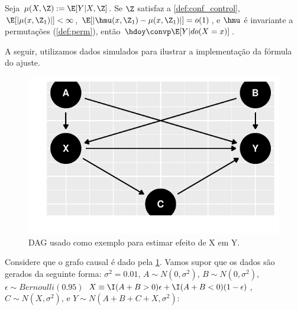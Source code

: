 \begin{theorem}
 \label{thm:conv_ajuste}
 Seja $\mu(X,\Z) := \E[Y|X,\Z]$.
 Se $\Z$ satisfaz a \cref{def:conf_control},
 $\E[|\mu(x,\Z_1)|] < \infty$,
 $\E[|\hmu(x,\Z_1)-\mu(x,\Z_1)|] = o(1)$, 
 e $\hmu$ é invariante a permutações (\cref{def:perm}), então
 $\hdoy \convp \E[Y|do(X=x)]$.
\end{theorem}

A seguir, utilizamos dados simulados para
ilustrar a implementação da fórmula do ajuste.

\begin{example}
 \label{ex:backdoor_est_ajuste}
\begin{knitrout}
\color{fgcolor}\begin{figure}[t]

{\centering \includegraphics[width=\maxwidth]{figure/backdoor_est_ex-1} 

}

\caption[DAG usado como exemplo para estimar efeito de X em Y]{DAG usado como exemplo para estimar efeito de X em Y.}\label{fig:backdoor_est_ex}
\end{figure}

\end{knitrout}

Considere que o grafo causal é
dado pela \cref{fig:backdoor_est_ex}.
Vamos supor que os dados são gerados da seguinte forma:
$\sigma^2 = 0.01$,
$A \sim N(0, \sigma^2)$, 
$B \sim N(0, \sigma^2)$,
$\epsilon \sim Bernoulli(0.95)$
$X \equiv \I(A + B > 0)\epsilon + \I(A + B < 0)(1-\epsilon)$,
$C \sim N(X, \sigma^2)$, e
$Y \sim N(A + B + C + X, \sigma^2)$:

\begin{knitrout}
\color{fgcolor}\begin{kframe}
\begin{alltt}
 \hlkwb{<-} \hlopt{::}\hlstd{(}\hlstd{)}


\end{alltt}
\end{kframe}
\end{knitrout}
\end{example}
